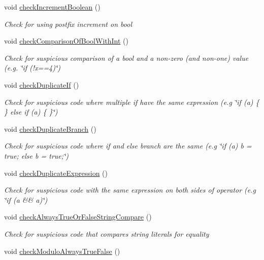 \begin{DoxyCompactItemize}
void \hyperlink{class_check_other_a88bbdbc115e7052f4f1e50ea8f353337}{check\-Increment\-Boolean} ()
\begin{DoxyCompactList}\small\item\em Check for using postfix increment on bool \end{DoxyCompactList}\item 
void \hyperlink{class_check_other_aafe90e2c6e77a85d2887ebe93c8402cb}{check\-Comparison\-Of\-Bool\-With\-Int} ()
\begin{DoxyCompactList}\small\item\em Check for suspicious comparison of a bool and a non-\/zero (and non-\/one) value (e.\-g. \char`\"{}if (!x==4)\char`\"{}) \end{DoxyCompactList}\item 
void \hyperlink{class_check_other_a8355a63bd745abe6b41967e818516305}{check\-Duplicate\-If} ()
\begin{DoxyCompactList}\small\item\em Check for suspicious code where multiple if have the same expression (e.\-g \char`\"{}if (a) \{ \} else if (a) \{ \}\char`\"{}) \end{DoxyCompactList}\item 
void \hyperlink{class_check_other_a9a39143088d45e4b6643c00155510781}{check\-Duplicate\-Branch} ()
\begin{DoxyCompactList}\small\item\em Check for suspicious code where if and else branch are the same (e.\-g \char`\"{}if (a) b = true; else b = true;\char`\"{}) \end{DoxyCompactList}\item 
void \hyperlink{class_check_other_a314eb94047312b3247328279226b818a}{check\-Duplicate\-Expression} ()
\begin{DoxyCompactList}\small\item\em Check for suspicious code with the same expression on both sides of operator (e.\-g \char`\"{}if (a \&\& a)\char`\"{}) \end{DoxyCompactList}\item 
void \hyperlink{class_check_other_a5dfa3ce6a66aca17ee369d4c7ab5d5e7}{check\-Always\-True\-Or\-False\-String\-Compare} ()
\begin{DoxyCompactList}\small\item\em Check for suspicious code that compares string literals for equality \end{DoxyCompactList}\item 
void \hyperlink{class_check_other_afc2eba35a2d41de3ffbafc6bc5915b15}{check\-Modulo\-Always\-True\-False} ()

\end{DoxyCompactItemize}
